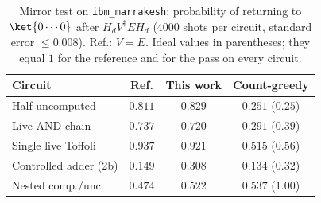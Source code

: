 \begin{table}[t]
\centering\small
\caption{Mirror test on \texttt{ibm\_marrakesh}: probability of returning to
$\ket{0\cdots0}$ after $H_d V^\dagger E H_d$ ($4000$ shots per circuit, standard error
$\le0.008$). Ref.: $V=E$. Ideal values in parentheses;
they equal $1$ for the reference and for the pass on every circuit.}
\label{tab:mirror}
\setlength{\tabcolsep}{2.5pt}
\begin{tabular}{lccc}
\toprule
Circuit & Ref. & This work & Count-greedy \\
\midrule
Half-uncomputed & $0.811$ & $0.829$ & $0.251$ ($0.25$) \\
Live AND chain & $0.737$ & $0.720$ & $0.291$ ($0.39$) \\
Single live Toffoli & $0.937$ & $0.921$ & $0.515$ ($0.56$) \\
Controlled adder (2b) & $0.149$ & $0.308$ & $0.134$ ($0.32$) \\
Nested comp./unc. & $0.474$ & $0.522$ & $0.537$ ($1.00$) \\
\bottomrule
\end{tabular}
\end{table}
